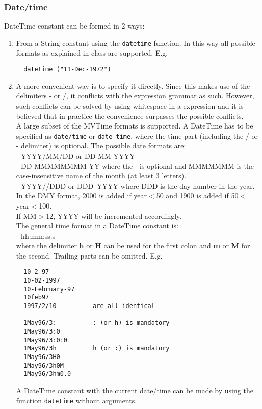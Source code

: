 \subsubsection{\label{TAQL:DATETIMECONST}Date/time}
  DateTime constant can be formed in 2 ways:
  \begin{enumerate}
  \item From a String constant using the \texttt{datetime} function.
    In this way all possible formats as explained in class
    are supported. E.g.
\begin{verbatim}
  datetime ("11-Dec-1972")
\end{verbatim}
  \item A more convenient way is to specify it directly. Since this
    makes use of the delimiters - or /, it conflicts with the
    expression grammar as such. However, such conflicts can be
    solved by using whitespace in a expression and it is believed
    that in practice the convenience surpasses the possible
    conflicts.
    \\A large subset of the MVTime formats is supported.
    A DateTime has to be specified as \texttt{date/time}
    or \texttt{date-time}, where the time part (including
    the / or - delimiter) is optional.
    The possible date formats are:
    \\- YYYY/MM/DD or DD-MM-YYYY
    \\- DD-MMMMMMMM-YY where the - is optional and MMMMMMM is the
    case-insensitive name of the month (at least 3 letters).
    \\- YYYY//DDD or DDD--YYYY where DDD is the day number in
    the year.
    \\In the DMY format, 2000 is added if year$<$50 and
    1900 is added if 50$<=$year$<$100.
    \\If MM$>$12, YYYY will be incremented accordingly.
    \\The general time format in a DateTime constant is:
    \\- hh:mm:ss.s
    \\where the delimiter \textbf{h} or \textbf{H} can be used
    for the first colon and \textbf{m} or \textbf{M} for the second.
    Trailing parts can be omitted. E.g.
\begin{verbatim}
  10-2-97
  10-02-1997
  10-February-97
  10feb97
  1997/2/10          are all identical

  1May96/3:          : (or h) is mandatory
  1May96/3:0
  1May96/3:0:0
  1May96/3h          h (or :) is mandatory
  1May96/3H0
  1May96/3h0M
  1May96/3hm0.0
\end{verbatim}
    A DateTime constant with the current date/time can be made
    by using the function \texttt{datetime} without arguments.
  \end{enumerate}

